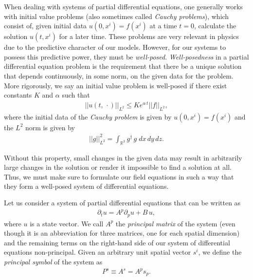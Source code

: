 When dealing with systems of partial differential equations, one generally works with initial value problems (also sometimes called \textit{Cauchy problems}), which consist of, given initial data $u(0,x^i) = f(x^i)$ at a time $t = 0$, calculate the solution $u(t,x^i)$ for a later time. These problems are very relevant in physics due to the predictive character of our models. However, for our systems to possess this predictive power, they must be \textit{well-posed}. \textit{Well-posedness} in a partial differential equation problem is the requirement that there be a unique solution that depends continuously, in some norm, on the given data for the problem. More rigorously, we say an initial value problem is well-posed if there exist constants $K$ and $\alpha$ such that
%
\begin{align}
 ||u(t,\, \cdot)||_{L^2} \leq Ke^{\alpha \, t} ||f||_{L^2},
\end{align}
%
where the initial data of the \textit{Cauchy problem} is given by $u(0,x^i) = f(x^i)$ and the $L^2$ norm is given by
%
\begin{align}
 ||g||_{L^2}^2 = \int_{\mathbb{R}^3} g^\dagger\, g \;dx\,dy\,dz.
\end{align}

Without this property, small changes in the given data may result in arbitrarily large changes in the solution or render it impossible to find a solution at all. Thus, we must make sure to formulate our field equations in such a way that they form a well-posed system of differential equations.

Let us consider a system of partial differential equations that can be written as
%
\begin{align}
    \partial_t u = A^p \partial_p u + B \, u,
    \label{eq:strong_hyp}
\end{align}
%
where $u$ is a state vector. We call $A^p$ the \textit{principal matrix} of the system (even though it is an abbreviation for three matrices, one for each spatial dimension) and the remaining terms on the right-hand side of our system of differential equations non-principal. Given an arbitrary unit spatial vector $s^i$, we define the \textit{principal symbol} of the system as
%
\begin{align}
 P^s \equiv A^s = A^p s_p.
\end{align}

